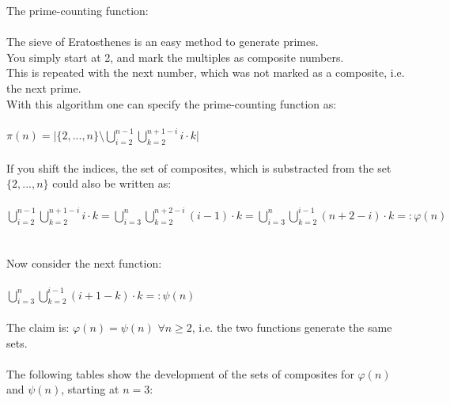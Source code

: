\documentclass[12pt,ngerman]{article}
\theoremstyle{definition}
\begin{document}
The prime-counting function:\\\\
The sieve of Eratosthenes is an easy method to generate primes.\\
You simply start at 2, and mark the multiples as composite numbers.\\
This is repeated with the next number, which was not marked as a composite, i.e. the next prime.\\
With this algorithm one can specify the prime-counting function as:\\\\
$\pi(n) = \vert \{2,...,n\} \setminus \bigcup\limits_{i = 2}^{n-1} \bigcup\limits_{k = 2}^{n+1-i} i \cdot k \vert$\\\\
If you shift the indices, the set of composites, which is substracted from the set $\{2,...,n\}$ could also be written as:\\\\
$\bigcup\limits_{i = 2}^{n-1} \bigcup\limits_{k = 2}^{n+1-i} i \cdot k = \bigcup\limits_{i = 3}^{n} \bigcup\limits_{k = 2}^{n+2-i} (i-1) \cdot k = \bigcup\limits_{i = 3}^{n} \bigcup\limits_{k = 2}^{i-1} (n+2-i) \cdot k =: \varphi(n)$\\\\\\
Now consider the next function:\\\\
$\bigcup\limits_{i = 3}^{n} \bigcup\limits_{k = 2}^{i-1} (i+1-k) \cdot k =: \psi(n)$\\\\
The claim is: $\varphi(n) = \psi(n)$ $\forall n \geq 2$, i.e. the two functions generate the same sets.\\\\
The following tables show the development of the sets of composites for $\varphi(n)$ and $\psi(n)$, starting at $n=3$:\\
\end{document}
